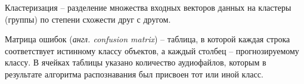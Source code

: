 \begin{enumdescript}
	\item[Кластеризация] -- разделение множества входных векторов данных на кластеры (группы) по степени схожести друг с другом.
	\item [Матрица ошибок ] (\textit{англ. confusion matrix}) -- таблица, в которой каждая строка соответствует истинному классу объектов, а каждый столбец -- прогнозируемому классу. В ячейках таблицы указано количество аудиофайлов, которым в результате алгоритма распознавания был присвоен тот или иной класс.
\end{enumdescript}
